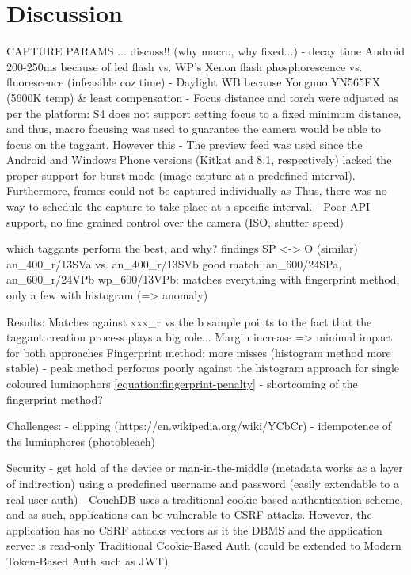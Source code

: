 \documentclass[thesis.tex]{subfiles}
\begin{document}
\chapter{Discussion}
\label{chapter:discussion}

CAPTURE PARAMS ... discuss!! (why macro, why fixed...)
- decay time Android 200-250ms because of led flash vs. WP's Xenon flash
phosphorescence vs. fluorescence (infeasible coz time)
- Daylight WB because Yongnuo YN565EX (5600K temp) \& least compensation
- Focus distance and torch were adjusted as per the platform: S4 does not support setting focus to a fixed minimum distance, and thus, macro focusing was used to guarantee the camera would be able to focus on the taggant. However this
- The preview feed was used since the Android and Windows Phone versions (Kitkat and 8.1, respectively) lacked the proper support for burst mode (image capture at a predefined interval). Furthermore, frames could not be captured individually as Thus, there was no way to schedule the capture to take place at a specific interval.
- Poor API support, no fine grained control over the camera (ISO, shutter speed)

which taggants perform the best, and why?
findings
SP <-> O (similar)
an\_400\_r/13SVa vs. an\_400\_r/13SVb
good match: an\_600/24SPa, an\_600\_r/24VPb
wp\_600/13VPb: matches everything with fingerprint method, only a few with histogram (=> anomaly)



Results:
Matches against xxx\_r vs the b sample points to the fact that the taggant creation process plays a big role...
Margin increase => minimal impact for both approaches
Fingerprint method: more misses (histogram method more stable)
- peak method performs poorly against the histogram approach for single coloured luminophors
\ref{equation:fingerprint-penalty} - shortcoming of the fingerprint method?

Challenges:
- clipping (https://en.wikipedia.org/wiki/YCbCr)
- idempotence of the luminphores (photobleach)

Security
- get hold of the device or man-in-the-middle (metadata works as a layer of indirection)
using a predefined username and password (easily extendable to a real user auth)
- CouchDB uses a traditional cookie based authentication scheme, and as such, applications can be vulnerable to CSRF attacks. However, the application has no CSRF attacks vectors as it the DBMS and the application server is read-only
Traditional Cookie-Based Auth (could be extended to Modern Token-Based Auth such as JWT)
\end{document}
